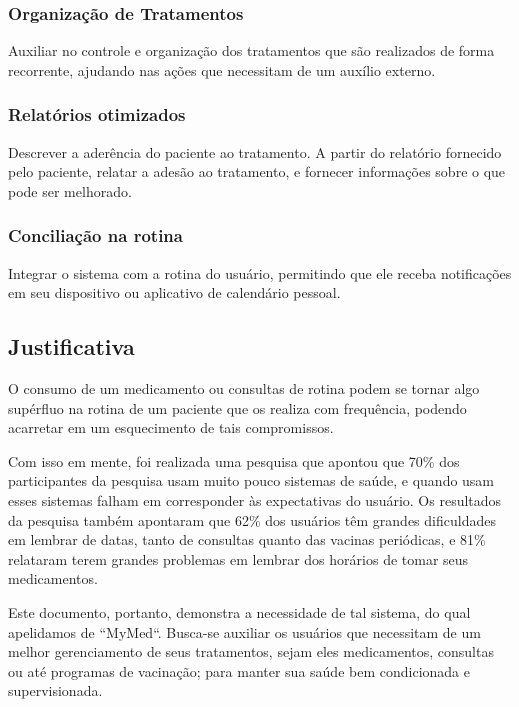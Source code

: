 \documentclass[
	article,			%
	12pt,				%
	oneside,			%
	a4paper,			%
    BIBLATEX,           %
	english,			%
	brazil,				%
	sumario=tradicional
	]{abntex2}
\newcommand\nomeprojeto{MyMed}
\begin{document}
\subsubsection{Organização de Tratamentos}

Auxiliar no controle e organização dos tratamentos que são realizados de forma recorrente, ajudando nas ações que necessitam de um auxílio externo.


\subsubsection{Relatórios otimizados}

Descrever a aderência do paciente ao tratamento. A partir do relatório fornecido pelo paciente, relatar a adesão ao tratamento, e fornecer informações sobre o que pode ser melhorado.


\subsubsection{Conciliação na rotina}

Integrar o sistema com a rotina do usuário, permitindo que ele receba notificações em seu dispositivo ou aplicativo de calendário pessoal.


\subsection{Justificativa}    

O consumo de um medicamento ou consultas de rotina podem se tornar algo supérfluo na rotina de um paciente que os realiza com frequência, podendo acarretar em um esquecimento de tais compromissos.

Com isso em mente, foi realizada uma pesquisa que apontou que 70\% dos participantes da pesquisa usam muito pouco sistemas de saúde, e quando usam esses sistemas falham em corresponder às expectativas do usuário. Os resultados da pesquisa também apontaram que 62\% dos usuários têm grandes dificuldades em lembrar de datas, tanto de consultas quanto das vacinas periódicas, e 81\% relataram terem grandes problemas em lembrar dos horários de tomar seus medicamentos.

Este documento, portanto, demonstra a necessidade de tal sistema, do qual apelidamos de ``\nomeprojeto``. Busca-se auxiliar os usuários que necessitam de um melhor gerenciamento de seus tratamentos, sejam eles medicamentos, consultas ou até programas de vacinação; para manter sua saúde bem condicionada e supervisionada.
\end{document}
